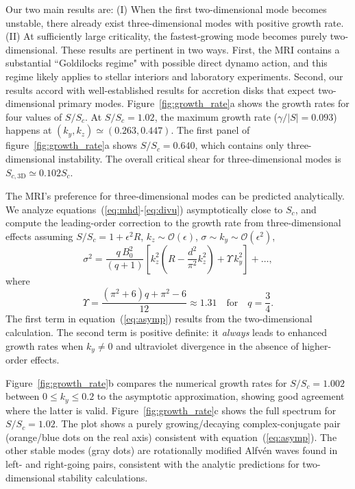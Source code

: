 \documentclass[aps,prl,reprint,superscriptaddress]{revtex4-1}
\newcommand{\SSC}{S/S_{c}}
\begin{document}
Our two main results are: 
(I) When the first two-dimensional mode becomes unstable, there already exist three-dimensional modes with positive growth rate. 
(II) At sufficiently large criticality, the fastest-growing mode becomes purely two-dimensional. 
These results are pertinent in two ways. 
First, the MRI contains a substantial ``Goldilocks regime" with possible direct dynamo action, and this regime likely applies to stellar interiors and laboratory experiments. 
Second, our results accord with well-established results for accretion disks that expect two-dimensional primary modes.
Figure~\ref{fig:growth_rate}a shows the growth rates for four values of $\SSC$. 
At $\SSC=1.02$, the maximum growth rate ($\gamma/|S|=0.093$) happens at $(k_{y},k_{z})\simeq(0.263,0.447)$.
The first panel of figure~\ref{fig:growth_rate}a shows $\SSC=0.640$, which contains only three-dimensional instability.
The overall critical shear for three-dimensional modes is $S_{c,\text{3D}}\simeq0.102S_c$.

The MRI's preference for three-dimensional modes can be predicted analytically.
We analyze equations~(\ref{eq:mhd}-\ref{eq:divu}) asymptotically close to $S_{c}$, and compute the leading-order correction to the growth rate from three-dimensional effects assuming $\SSC=1+\epsilon^{2}R$, $k_{z}\sim\mathcal{O}(\epsilon)$, $\sigma\sim{k_{y}}\sim\mathcal{O}(\epsilon^{2})$, 
\begin{equation}\label{eq:asymp}
\sigma^{2}=\frac{q\,B_{0}^{2}}{(q+1)}\left[ k_{z}^{2}\left(R-\frac{d^2}{\pi^{2}}k_{z}^{2}\right)+\Upsilon\,k_{y}^{2}\right]+\ldots,
\end{equation}
where
\begin{equation}
\Upsilon=\frac{\left(\pi^{2}+6\right) q+\pi^{2}-6}{12}\approx1.31\quad\text{for}\quad{q}=\frac{3}{4}.
\end{equation}
The first term in equation~(\ref{eq:asymp}) results from the two-dimensional calculation.
The second term is positive definite: it \emph{always} leads to enhanced growth rates when $k_{y}\neq0$ and ultraviolet divergence in the absence of higher-order effects.

Figure~\ref{fig:growth_rate}b compares the numerical growth rates for $\SSC=1.002$ between $0\le{k_{y}}\le0.2$ to the asymptotic approximation, showing good agreement where the latter is valid.
Figure~\ref{fig:growth_rate}c shows the full spectrum for $\SSC=1.02$.
The plot shows a purely growing/decaying complex-conjugate pair (orange/blue dots on the real axis) consistent with equation~(\ref{eq:asymp}).
The other stable modes (gray dots) are rotationally modified Alfv\'{e}n waves found in left- and right-going pairs, consistent with the analytic predictions for two-dimensional stability calculations.
\end{document}
